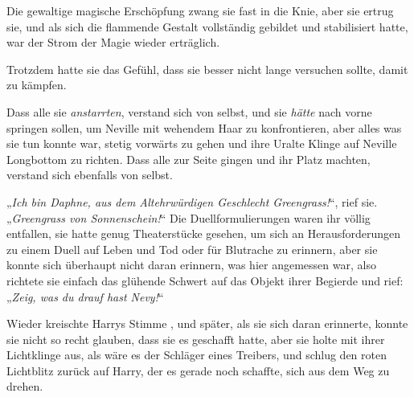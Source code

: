 Die gewaltige magische Erschöpfung zwang sie fast in die Knie, aber sie ertrug sie, und als sich die flammende Gestalt vollständig gebildet und stabilisiert hatte, war der Strom der Magie wieder erträglich.

Trotzdem hatte sie das Gefühl, dass sie besser nicht lange versuchen sollte, damit zu kämpfen.

Dass alle sie \emph{anstarrten}, verstand sich von selbst, und sie \emph{hätte} nach vorne springen sollen, um Neville mit wehendem Haar zu konfrontieren, aber alles was sie tun konnte war, stetig vorwärts zu gehen und ihre Uralte Klinge auf Neville Longbottom zu richten. Dass alle zur Seite gingen und ihr Platz machten, verstand sich ebenfalls von selbst.

„\emph{Ich bin Daphne, aus dem Altehrwürdigen Geschlecht Greengrass!}“, rief sie. „\emph{Greengrass von Sonnenschein!}“ Die Duellformulierungen waren ihr völlig entfallen, sie hatte genug Theaterstücke gesehen, um sich an Herausforderungen zu einem Duell auf Leben und Tod oder für Blutrache zu erinnern, aber sie konnte sich überhaupt nicht daran erinnern, was hier angemessen war, also richtete sie einfach das glühende Schwert auf das Objekt ihrer Begierde und rief: „\emph{Zeig, was du drauf hast Nevy!}“

Wieder kreischte Harrys Stimme , und später, als sie sich daran erinnerte, konnte sie nicht so recht glauben, dass sie es geschafft hatte, aber sie holte mit ihrer Lichtklinge aus, als wäre es der Schläger eines Treibers, und schlug den roten Lichtblitz zurück auf Harry, der es gerade noch schaffte, sich aus dem Weg zu drehen.

